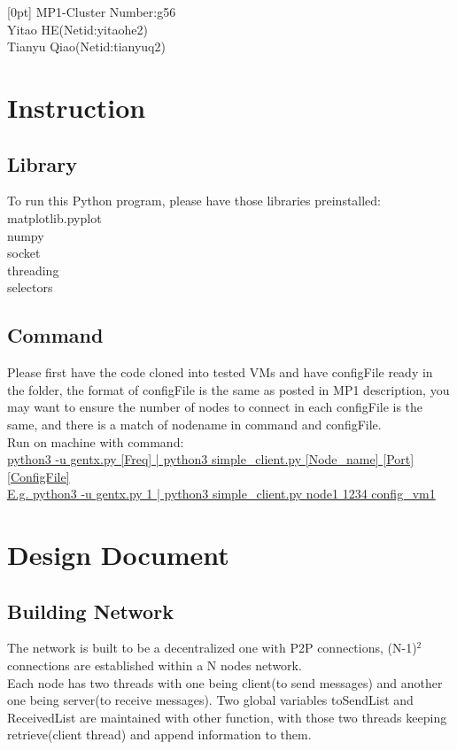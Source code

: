 \documentclass{article}
\begin{document}
[0pt]{\addvspace{4mm}\filright}
{\bfseries\contentspush{\bfseries{\thecontentslabel}\hspace{1.2mm}\ }}
{}{\hspace*{-0.8em}\bf{\contentspage}}
\newpage
MP1-Cluster Number:g56\\
Yitao HE(Netid:yitaohe2)\\
Tianyu Qiao(Netid:tianyuq2)

\section{Instruction}
\subsection{Library}
To run this Python program, please have those libraries preinstalled:\\
matplotlib.pyplot\\
numpy\\
socket\\
threading\\
selectors\\



\subsection{Command}
Please first have the code cloned into tested VMs and have configFile ready in the folder, the format of configFile is the same as posted in MP1 description, you may want to ensure the number of nodes to connect in each configFile is the same, and there is a match of nodename in command and configFile.\\

Run on machine with command: \\
\url{python3 -u gentx.py [Freq] | python3 simple_client.py [Node_name] [Port] [ConfigFile]} \\

\smallskip\noindent
\url{E.g. python3 -u gentx.py 1 | python3 simple_client.py node1 1234 config_vm1}


\section{Design Document}
\subsection{Building Network}
The network is built to be a decentralized one with P2P connections, (N-1)$^2$ connections are established within a N nodes network.\\
Each node has two threads with one being client(to send messages) and another one being server(to receive messages). Two global variables toSendList and ReceivedList are maintained with other function, with those two threads keeping retrieve(client thread) and append information to them.\\
\end{document}
